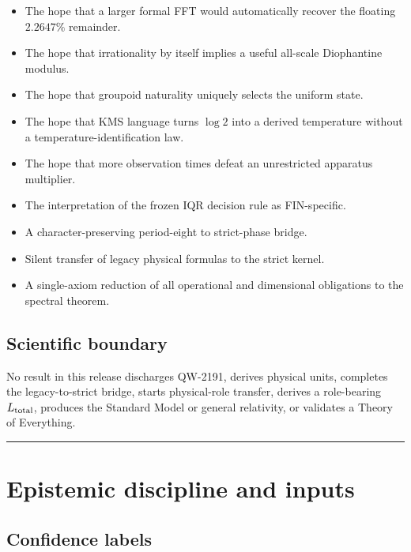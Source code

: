 \documentclass[11pt,a4paper,openany]{report}
\begin{document}
\begin{itemize}
\item 
The hope that a larger formal FFT would automatically recover the floating \(2.2647\%\) remainder.

\item 
The hope that irrationality by itself implies a useful all-scale Diophantine modulus.

\item 
The hope that groupoid naturality uniquely selects the uniform state.

\item 
The hope that KMS language turns \(\log2\) into a derived temperature without a temperature-identification law.

\item 
The hope that more observation times defeat an unrestricted apparatus multiplier.

\item 
The interpretation of the frozen IQR decision rule as FIN-specific.

\item 
A character-preserving period-eight to strict-phase bridge.

\item 
Silent transfer of legacy physical formulas to the strict kernel.

\item 
A single-axiom reduction of all operational and dimensional obligations to the spectral theorem.

\end{itemize}

\section{Scientific boundary}

No result in this release discharges QW-2191, derives physical units, completes the legacy-to-strict bridge, starts physical-role transfer, derives a role-bearing \(L_{\rm total}\), produces the Standard Model or general relativity, or validates a Theory of Everything.

\par\medskip\hrule\medskip

\chapter{Epistemic discipline and inputs}

\section{Confidence labels}
\end{document}
